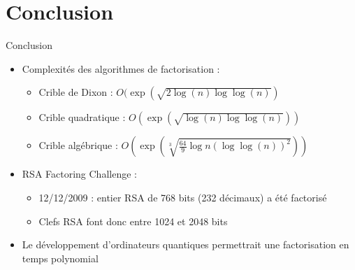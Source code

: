 \documentclass[utf8,10pt,french]{beamer}
\begin{document}
\section{Conclusion}
\begin{frame}{Conclusion}
\begin{itemize}
\item Complexités des algorithmes de factorisation :
\begin{itemize}  
\item Crible de Dixon : $O(\exp\left(\sqrt{2\log(n)\log\log(n)}\right)$
\item Crible quadratique : $O(\exp\left(\sqrt{\log (n) \log \log (n)}\right))$
\item Crible algébrique : $O(\exp\left(\sqrt[3]{\frac{64}{9}\log n (\log \log (n))^2}\right))$
\end{itemize} \pause
\item RSA Factoring Challenge :
\begin{itemize}
\item 12/12/2009 : entier RSA de 768 bits (232 décimaux) a été factorisé
\item Clefs RSA font donc entre 1024 et 2048 bits
\end{itemize} \pause
\item Le développement d'ordinateurs quantiques permettrait une factorisation en temps polynomial
\end{itemize}
\end{frame}
\end{document}
